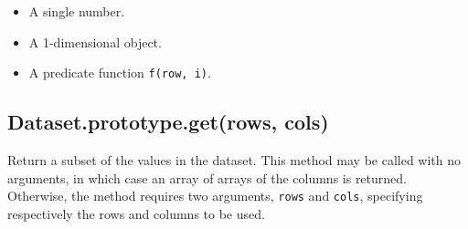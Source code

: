 \documentclass{article}
\begin{document}
\begin{itemize}

\item A single number.

\item A 1-dimensional object.

\item A predicate function \texttt{f(row, i)}.

\end{itemize}

    \subsection*{Dataset.prototype.get(rows, cols)}
    Return a subset of the values in the dataset. This method may be called with
no arguments, in which case an array of arrays of the columns is returned.
Otherwise, the method requires two arguments, \texttt{rows} and \texttt{cols}, specifying
respectively the rows and columns to be used.
\end{document}
